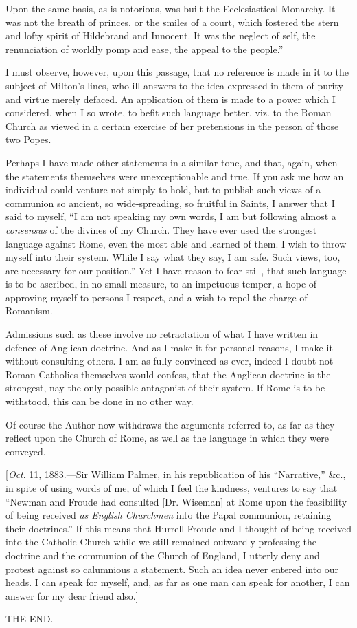 Upon the same basis, as is notorious, was built the
Ecclesiastical Monarchy. It was not the breath of princes, or the
smiles of a court, which fostered the stern and lofty spirit of
Hildebrand and Innocent. It was the neglect of self, the renunciation
of worldly pomp and ease, the appeal to the people.''

I must observe, however, upon this passage, that no
reference is made in it to the subject of Milton's lines, who ill
answers to the idea expressed in them of purity and virtue merely
defaced. An application of them is made to a power which I considered,
when I so wrote, to befit such language better, viz. to the Roman
Church as viewed in a certain exercise of her pretensions in the
person of those two Popes.

Perhaps I have made other statements in a similar
tone, and that, again, when the statements themselves were
unexceptionable and true. If you ask me how an individual could
venture not simply to hold, but to publish such views of a communion
so ancient, so wide-spreading, so fruitful in Saints, I answer that I
said to myself, ``I am not speaking my own words, I am but
following almost a \emph{consensus} of the divines of my Church.
They have ever used the strongest language against Rome, even the most
able and learned of them. I wish to throw myself into their system.
While I say what they say, I am safe. Such views, too, are necessary
for our position.'' Yet I have reason to fear still, that such
language is to be ascribed, in no small measure, to an impetuous
temper, a hope of approving myself to persons I respect, and a wish to
repel the charge of Romanism.

Admissions such as these involve no retractation of
what I have written in defence of Anglican doctrine. And as I make it
for personal reasons, I make it without consulting others. I am as
fully convinced as ever, indeed I doubt not Roman Catholics themselves
would confess, that the Anglican doctrine is the strongest, nay the
only possible antagonist of their system. If Rome is to be withstood,
this can be done in no other way.

Of course the Author now withdraws the arguments referred to, as
far as they reflect upon the Church of Rome, as well as the language
in which they were conveyed.

[\emph{Oct}. 11, 1883.—Sir William Palmer, in his republication
of his ``Narrative,'' \&c., in spite of using words of me,
of which I feel the kindness, ventures to say that ``Newman and
Froude had consulted [Dr. Wiseman] at Rome upon the feasibility of
being received \emph{as English Churchmen} into the Papal communion,
retaining their doctrines.'' If this means that Hurrell Froude and
I thought of being received into the Catholic Church while we still
remained outwardly professing the doctrine and the communion of the
Church of England, I utterly deny and protest against so calumnious a
statement. Such an idea never entered into our heads. I can speak for
myself, and, as far as one man can speak for another, I can answer for
my dear friend also.]

THE END.
